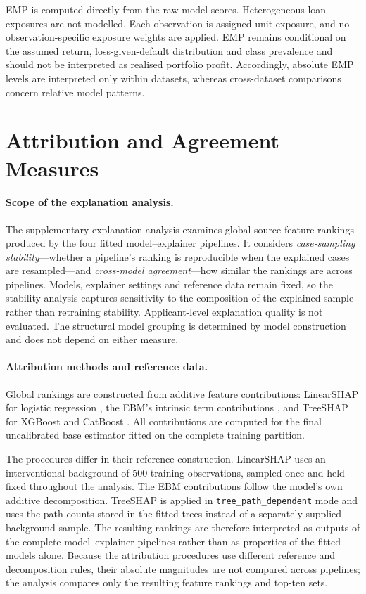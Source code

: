 EMP is computed directly from the raw model scores. Heterogeneous loan
exposures are not modelled. Each observation is assigned unit exposure, and no
observation-specific exposure weights are applied. EMP remains conditional on
the assumed return, loss-given-default distribution and class prevalence
\citep{xuProfitRiskdrivenCredit2024} and should not be interpreted as realised
portfolio profit. Accordingly, absolute EMP levels are interpreted only within
datasets, whereas cross-dataset comparisons concern relative model patterns. 


\section{Attribution and Agreement Measures}\label{sec:explanations}

\paragraph{Scope of the explanation analysis.}
The supplementary explanation analysis examines global source-feature rankings
produced by the four fitted model--explainer pipelines. It considers
\emph{case-sampling stability}---whether a pipeline's ranking is reproducible
when the explained cases are resampled---and \emph{cross-model agreement}---how
similar the rankings are across pipelines. Models, explainer settings and
reference data remain fixed, so the stability analysis captures sensitivity to
the composition of the explained sample rather than retraining stability.
Applicant-level explanation quality is not evaluated. The structural model
grouping is determined by model construction and does not depend on either
measure.


\paragraph{Attribution methods and reference data.}
Global rankings are constructed from additive feature contributions:
LinearSHAP for logistic regression
\citep{lundbergUnifiedApproachInterpreting2017}, the EBM's intrinsic term
contributions
\citep{louAccurateIntelligibleModels2013,
noriInterpretMLUnifiedFramework2019}, and TreeSHAP for XGBoost and CatBoost
\citep{lundbergLocalExplanationsGlobal2020}. All contributions are computed for
the final uncalibrated base estimator fitted on the complete training partition.

The procedures differ in their reference construction. LinearSHAP uses an
interventional background of 500 training observations, sampled once and held
fixed throughout the analysis. The EBM contributions follow the model's own
additive decomposition. TreeSHAP is applied in
\texttt{tree\_path\_dependent} mode and uses the path counts stored in the fitted
trees instead of a separately supplied background sample. The resulting rankings are therefore interpreted as outputs of the
complete model--explainer pipelines rather than as properties of the fitted
models alone. Because the attribution procedures use different reference and decomposition rules, their absolute magnitudes are not compared across pipelines; the analysis compares only the resulting feature rankings and top-ten sets.

